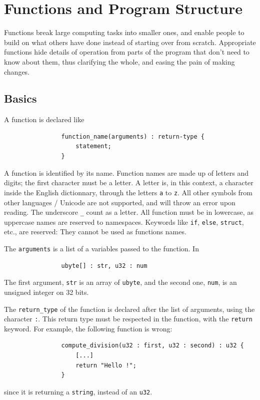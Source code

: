 \documentclass{scrartcl}
\begin{document}
    \section{Functions and Program Structure}
        Functions break large computing tasks into smaller ones, and enable people
        to build on what others have done instead of starting over from scratch.
        Appropriate functions hide details of operation from parts of the program
        that don't need to know about them, thus clarifying the whole, and easing
        the pain of making changes.
        \subsection{Basics}
            A function is declared like
            \begin{lstlisting}
                function_name(arguments) : return-type {
                    statement;
                }
            \end{lstlisting}
            A function is identified by its name. Function names are made up
            of letters and digits; the first character
            must be a letter. A letter is, in this context, a character inside
            the English dictionnary, through the letters \texttt{a} to \texttt{z}.
            All other symbols from other languages / Unicode are not supported,
            and will throw an error upon reading. The underscore \texttt{\_}
            count as a letter. All function must be in lowercase, as uppercase
            names are reserved to namespaces.
            Keywords like \texttt{if}, \texttt{else}, \texttt{struct}, etc., are
            reserved: They cannot be used as functions names.

            The \texttt{arguments} is a list of a variables passed to the function.
            In
            \begin{lstlisting}
                ubyte[] : str, u32 : num
            \end{lstlisting}
            The first argument, \texttt{str} is an array of \texttt{ubyte}, and
            the second one, \texttt{num}, is an unsigned integer on 32 bits.

            The \texttt{return\_type} of the function is declared after the list
            of arguments, using the character \texttt{:}. This return type
            must be respected in the function, with the \texttt{return} keyword.
            For example, the following function is wrong:
            \begin{lstlisting}
                compute_division(u32 : first, u32 : second) : u32 {
                    [...]
                    return "Hello !";
                }
            \end{lstlisting}
            since it is returning a \texttt{string}, instead of an \texttt{u32}.
\end{document}
